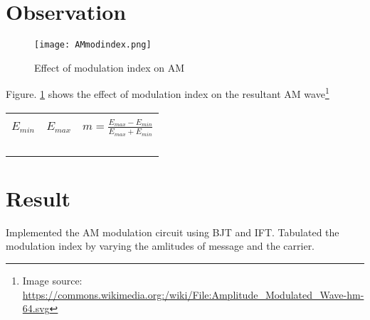\section*{Observation}


\begin{figure}[h]

\texttt{[image: AMmodindex.png]}
\caption{Effect of modulation index on AM}
\label{AMmodindex1}
\end{figure}
\noindent Figure. \ref{AMmodindex1}  shows the effect of modulation index on the resultant AM wave\footnote{Image source: \url{https://commons.wikimedia.org:/wiki/File:Amplitude_Modulated_Wave-hm-64.svg}}
\begin{center}

\begin{tabular}{|l|l|l|}

\hline
 & &\\
 
$E_{min}$  & $E_{max}$ & $m=\frac{E_{max}-E_{min}}{E_{max}+E_{min}}$ \\
 & & \\ \hline
 & & \\ \hline
& & \\ \hline
& & \\ \hline


\end{tabular}
\end{center}
\section*{Result}
Implemented the AM modulation circuit using BJT and IFT. Tabulated the modulation index by varying the amlitudes of message and the carrier.

